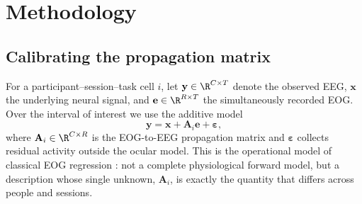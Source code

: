 \section{Methodology}
\label{sec:methodology}

\subsection{Calibrating the propagation matrix}
\label{sec:method-calibration}

For a participant--session--task cell $i$, let $\mathbf{y}\in\R^{C\times T}$ denote the observed EEG, $\mathbf{x}$ the underlying neural signal, and $\mathbf{e}\in\R^{R\times T}$ the simultaneously recorded EOG. Over the interval of interest we use the additive model
\begin{equation}
  \mathbf{y}=\mathbf{x}+\mathbf{A}_i\mathbf{e}+\boldsymbol{\varepsilon},
  \label{eq:observation}
\end{equation}
where $\mathbf{A}_i\in\R^{C\times R}$ is the EOG-to-EEG propagation matrix and $\boldsymbol{\varepsilon}$ collects residual activity outside the ocular model. This is the operational model of classical EOG regression \cite{gratton1983ocular}: not a complete physiological forward model, but a description whose single unknown, $\mathbf{A}_i$, is exactly the quantity that differs across people and sessions.

